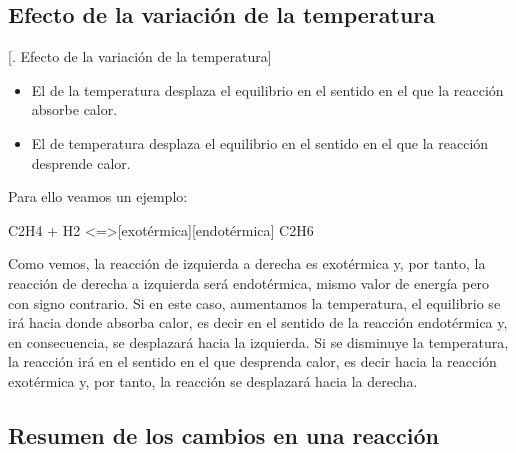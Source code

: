     \subsection{Efecto de la variación de la temperatura}[\thesection. Efecto de la variación de la temperatura]

    \begin{itemize}
        \item El  de la temperatura desplaza el equilibrio en el sentido en el que la reacción absorbe calor.
        \item El  de temperatura desplaza el equilibrio en el sentido en el que la reacción desprende calor.
    \end{itemize}
    Para ello veamos un ejemplo:

    \begin{reaction}
        C2H4 \gas{} + H2 \gas{}  <=>[exotérmica][endotérmica] C2H6 \gas{} \label{rxn:hidrogenacionEteno}
    \end{reaction}

    Como vemos, la reacción de izquierda a derecha es exotérmica y, por tanto, la reacción de derecha a izquierda será endotérmica, mismo valor de energía pero con signo contrario.
    Si en este caso, aumentamos la temperatura, el equilibrio se irá hacia donde absorba calor, es decir en el sentido de la reacción endotérmica y, en consecuencia, se desplazará hacia la izquierda.
    Si se disminuye la temperatura, la reacción irá en el sentido en el que desprenda calor, es decir hacia la reacción exotérmica y, por tanto, la reacción se desplazará hacia la derecha.

    \subsection{Resumen de los cambios en una reacción}\label{subsec:resumen-de-los-cambios-en-una-reaccion}

